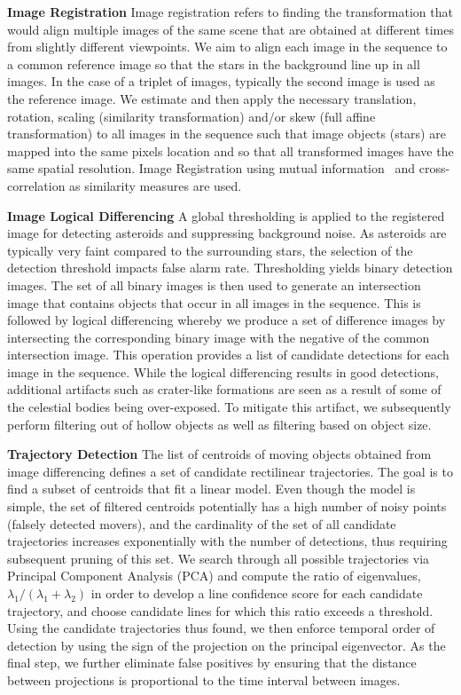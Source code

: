 \documentclass{article}
\begin{document}
{\bf Image Registration}
Image registration refers to finding the transformation that would align multiple images of the same scene that are obtained at different times from slightly different viewpoints.  We aim to align each image in the sequence to a common reference image so that the stars in the background line up in all images.  In the case of a triplet of images, typically the second image is used as the reference image.  We estimate and then apply the necessary translation, rotation, scaling (similarity transformation) and/or skew (full affine transformation) to all images in the sequence such that image objects (stars) are mapped into the same pixels location and so that all transformed images have the same spatial resolution.  Image Registration using mutual information~\cite{viola1997alignment} and cross-correlation as similarity measures are used. 

{\bf Image Logical Differencing}
A global thresholding is applied to the registered image for detecting asteroids and suppressing background noise.  As asteroids are typically very faint compared to the surrounding stars, the selection of the detection threshold impacts false alarm rate.  Thresholding yields binary detection images.  The set of all binary images is then used to generate an intersection image that contains objects that occur in all images in the sequence.  This is followed by logical differencing whereby we produce a set of difference images by intersecting the corresponding binary image with the negative of the common intersection image.  This operation provides a list of candidate detections for each image in the sequence.  While the logical differencing results in good detections, additional artifacts such as crater-like formations are seen as a result of some of the celestial bodies being over-exposed.  To mitigate this artifact, we subsequently perform filtering out of hollow objects as well as filtering based on object size.

{\bf Trajectory Detection}
The list of centroids of moving objects obtained from image differencing defines a set of candidate rectilinear trajectories.  The goal is to find a subset of centroids that fit a linear model. Even though the model is simple, the set of filtered centroids potentially has a high number of noisy points (falsely detected movers), and the cardinality of the set of all candidate trajectories increases exponentially with the number of detections, thus requiring subsequent pruning of this set.  We search through all possible trajectories via Principal Component Analysis (PCA) and compute the ratio of eigenvalues, $\lambda_{1}/(\lambda_{1}+ \lambda_{2})$ in order to develop a line confidence score for each candidate trajectory, and choose candidate lines for which this ratio exceeds a threshold. Using the candidate trajectories thus found, we then enforce temporal order of detection by using the sign of the projection on the principal eigenvector.  As the final step, we further eliminate false positives by ensuring that the distance between projections is proportional to the time interval between images.  
\end{document}
